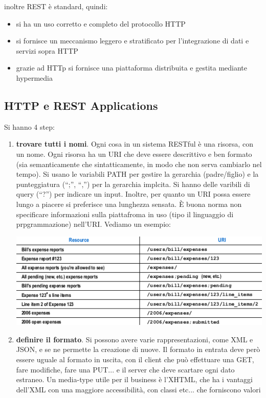 \documentclass[a4paper,12pt, oneside]{book}
\begin{document}
inoltre REST è standard, quindi:
\begin{itemize}
\item si ha un uso corretto e completo del protocollo HTTP
\item si fornisce un meccanismo leggero e stratificato per l'integrazione di dati e servizi sopra HTTP
\item grazie ad HTTp si fornisce una piattaforma distribuita e gestita mediante hypermedia
\end{itemize}
\subsection{HTTP e REST Applications}
Si hanno 4 step:
\begin{enumerate}
\item \textbf{trovare tutti i nomi}. Ogni cosa in un sistema RESTful è una risorsa, con un nome. Ogni risorsa ha un URI che deve essere descrittivo
  e ben formato (sia semanticamente che sintatticamente, in modo che non serva cambiarlo nel tempo). Si usano le variabili PATH per gestire la gerarchia
  (padre/figlio) e la punteggiatura (``;'', ``,'') per la gerarchia implcita. Si hanno delle varibili di query (``?'') per indicare un input. Inoltre, per quanto un URI
  possa essere lungo a piacere si preferisce una lunghezza sensata. È buona norma non specificare informazioni sulla piattafroma in uso (tipo il linguaggio di prpgrammazione)
  nell'URI. \newpage Vediamo un esempio:
  \begin{center}
    \includegraphics[scale=0.7]{img/nouns.png}
  \end{center}
\item \textbf{definire il formato}. Si possono avere varie rappresentazioni, come XML e JSON, e se ne permette la creazione di nuove. Il formato in entrata deve però essere
  uguale al formato in uscita, con il client che può effettuare una GET, fare modifiche, fare una PUT... e il server che deve scartare ogni dato estraneo.
  Un media-type utile per il business è l'XHTML, che ha i vantaggi dell'XML con una maggiore accessibilità, con classi etc... che forniscono valori

\end{enumerate}
\end{document}
